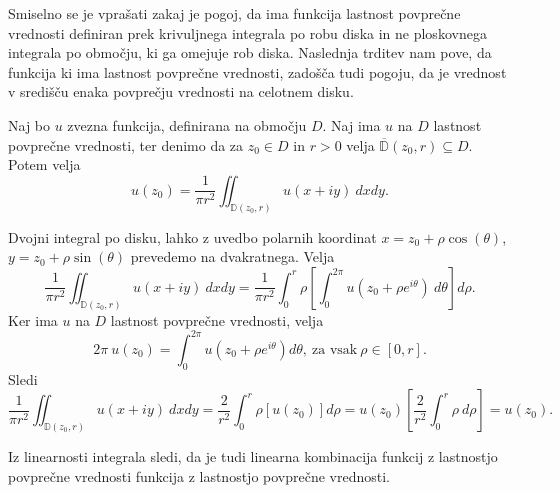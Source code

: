 \documentclass[mat1, tisk]{fmfdelo}
\begin{document}
    Smiselno se je vprašati zakaj je pogoj, da ima funkcija lastnost povprečne vrednosti definiran prek krivuljnega integrala po robu diska in ne ploskovnega integrala po območju, ki ga omejuje rob diska.
    Naslednja trditev nam pove, da funkcija ki ima lastnost povprečne vrednosti, zadošča tudi pogoju, da je vrednost v središču enaka povprečju vrednosti na celotnem disku.

    \begin{trditev}
        Naj bo $u$ zvezna funkcija, definirana na območju $D$. Naj ima $u$ na $D$ lastnost povprečne vrednosti, ter denimo da za $z_0 \in D$ in $r>0$ velja $\overline{\mathbb{D}}(z_0,r) \subseteq D$. Potem velja
        $$
            u(z_0) = \frac{1}{\pi r^2} \iint_{\mathbb{D}(z_0,r)}{u(x + iy)~dxdy}.
        $$
    \end{trditev}
    \begin{dokaz}
        Dvojni integral po disku, lahko z uvedbo polarnih koordinat $x = z_0 + \rho \cos(\theta)$, $y = z_0 + \rho \sin(\theta)$ prevedemo na dvakratnega. Velja
        $$
        \frac{1}{\pi r^2} \iint_{\mathbb{D}(z_0,r)}{u(x + iy)~dxdy} = \frac{1}{\pi r^2} \int_{0}^{r}{\rho \left[\int_{0}^{2 \pi} u(z_0 + \rho e^{i\theta})~d\theta \right]d\rho}. 
        $$
        Ker ima $u$ na $D$ lastnost povprečne vrednosti, velja
        $$
            2 \pi~u(z_0) = \int_{0}^{2 \pi}{u(z_0 + \rho e^{i \theta}) d\theta},~\text{za vsak}~\rho \in [0, r].
        $$
        Sledi
        $$
        \frac{1}{\pi r^2} \iint_{\mathbb{D}(z_0,r)}{u(x + iy)~dxdy} = \frac{2}{r^2} \int_{0}^{r}{\rho \left[u(z_0)\right]d\rho} = u(z_0) \left[\frac{2}{r^2} \int_{0}^{r}{\rho~d\rho}\right] = u(z_0).
        $$
    \end{dokaz}

    \begin{opomba}
        \label{linlpv}
        Iz linearnosti integrala sledi, da je tudi linearna kombinacija funkcij z lastnostjo povprečne vrednosti funkcija z lastnostjo povprečne vrednosti. 
    \end{opomba}
\end{document}

